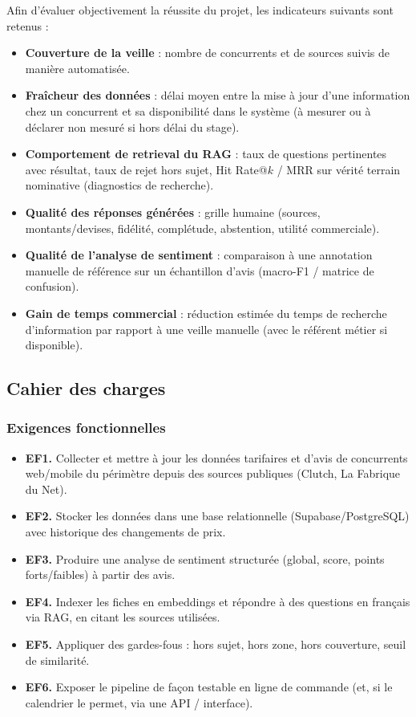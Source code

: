 Afin d'évaluer objectivement la réussite du projet, les indicateurs suivants sont retenus :
\begin{itemize}
    \item \textbf{Couverture de la veille} : nombre de concurrents et de sources suivis de manière automatisée.
    \item \textbf{Fraîcheur des données} : délai moyen entre la mise à jour d'une information chez un
    concurrent et sa disponibilité dans le système (à mesurer ou à déclarer non mesuré si hors délai du stage).
    \item \textbf{Comportement de retrieval du RAG} : taux de questions pertinentes avec résultat, taux de
    rejet hors sujet, Hit Rate@$k$ / MRR sur vérité terrain nominative (diagnostics de recherche).
    \item \textbf{Qualité des réponses générées} : grille humaine (sources, montants/devises, fidélité,
    complétude, abstention, utilité commerciale).
    \item \textbf{Qualité de l'analyse de sentiment} : comparaison à une annotation manuelle de référence
    sur un échantillon d'avis (macro-F1 / matrice de confusion).
    \item \textbf{Gain de temps commercial} : réduction estimée du temps de recherche d'information par
    rapport à une veille manuelle (avec le référent métier si disponible).
\end{itemize}

\subsection{Cahier des charges}

\subsubsection{Exigences fonctionnelles}

\begin{itemize}
    \item \textbf{EF1.} Collecter et mettre à jour les données tarifaires et d'avis de concurrents web/mobile
    du périmètre depuis des sources publiques (Clutch, La Fabrique du Net).
    \item \textbf{EF2.} Stocker les données dans une base relationnelle (Supabase/PostgreSQL) avec historique
    des changements de prix.
    \item \textbf{EF3.} Produire une analyse de sentiment structurée (global, score, points forts/faibles)
    à partir des avis.
    \item \textbf{EF4.} Indexer les fiches en embeddings et répondre à des questions en français via RAG,
    en citant les sources utilisées.
    \item \textbf{EF5.} Appliquer des gardes-fous : hors sujet, hors zone, hors couverture, seuil de
    similarité.
    \item \textbf{EF6.} Exposer le pipeline de façon testable en ligne de commande (et, si le calendrier le
    permet, via une API / interface).
\end{itemize}

